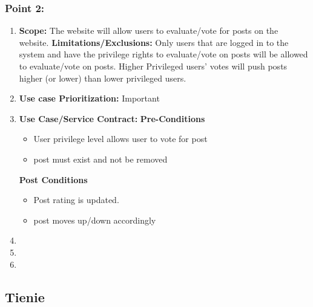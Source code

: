 \documentclass[11pt]{article}
\begin{document}
	  \subsubsection{Point 2:}
	  \begin{enumerate}
	  
	  
	  \item \textbf{Scope:} The website will allow users to evaluate/vote for posts on the website. \newline \newline
	  \textbf{Limitations/Exclusions:} Only users that are logged in to the system and have the privilege rights to evaluate/vote on posts will be allowed to evaluate/vote on posts. Higher Privileged users' votes will push posts higher (or lower) than lower privileged users. \newline \newline
	  
	  \item \textbf{Use case Prioritization: } Important \newline \newline
	  \item \textbf{Use Case/Service Contract: } \newline \newline
	  \textbf{Pre-Conditions}
	  \begin{itemize}
	  
	  \item User privilege level allows user to vote for post
	  \item post must exist and not be removed
	  \end{itemize}
	  \textbf{Post Conditions}
	  \begin{itemize}
	  \item Post rating is updated.
	  \item post moves up/down accordingly
	  \end{itemize}
	  \item
	  \item
	  \item
	  \end{enumerate}

\newpage

\graphicspath{ {../Diagrams/Tienie/} }
\subsection{Tienie}
\end{document}
